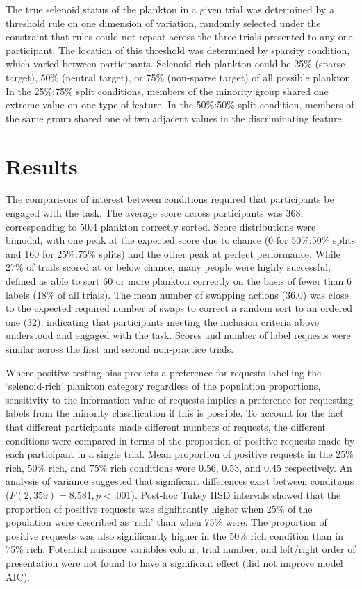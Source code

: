\documentclass[10pt,letterpaper]{article}
\begin{document}
The true selenoid status of the plankton in a given trial was determined by a threshold rule on one dimension of variation, randomly selected under the constraint that rules could not repeat across the three trials presented to any one participant. The location of this threshold was determined by sparsity condition, which varied between participants. Selenoid-rich plankton could be 25\% (sparse target), 50\% (neutral target), or 75\% (non-sparse target) of all possible plankton. In the 25\%:75\% split conditions, members of the minority group shared one extreme value on one type of feature. In the 50\%:50\% split condition, members of the same group shared one of two adjacent values in the discriminating feature.

\section{Results}
The comparisons of interest between conditions required that participants be engaged with the task. The average score across participants was 368, corresponding to 50.4 plankton correctly sorted. Score distributions were bimodal, with one peak at the expected score due to chance (0 for 50\%:50\% splits and 160 for 25\%:75\% splits) and the other peak at perfect performance. While 27\% of trials scored at or below chance, many people were highly successful, defined as able to sort 60 or more plankton correctly on the basis of fewer than 6 labels (18\% of all trials). The mean number of swapping actions (36.0) was close to the expected required number of swaps to correct a random sort to an ordered one (32), indicating that participants meeting the inclusion criteria above understood and engaged with the task. Scores and number of label requests were similar across the first and second non-practice trials.

Where positive testing bias predicts a preference for requests labelling the `selenoid-rich' plankton category regardless of the population proportions, sensitivity to the information value of requests implies a preference for requesting labels from the minority classification if this is possible. To account for the fact that different participants made different numbers of requests, the different conditions were compared in terms of the proportion of positive requests made by each participant in a single trial.
Mean proportion of positive requests in the 25\% rich, 50\% rich, and 75\% rich conditions were 0.56, 0.53, and 0.45 respectively. An analysis of variance suggested that significant differences exist between conditions ($F(2,359)=8.581, p<.001$). Post-hoc Tukey HSD intervals showed that the proportion of positive requests was significantly higher when 25\% of the population were described as `rich' than when 75\% were. The proportion of positive requests was also significantly higher in the 50\% rich condition than in 75\% rich. Potential nuisance variables colour, trial number, and left/right order of presentation were not found to have a significant effect (did not improve model AIC).
\end{document}
